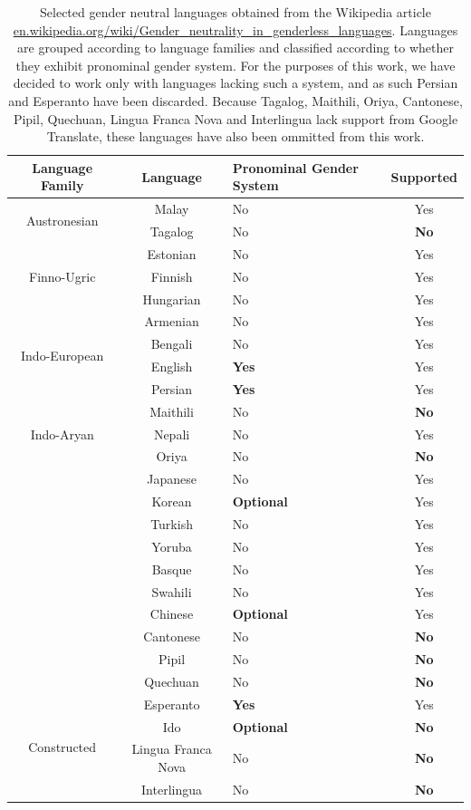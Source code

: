 \documentclass{article}
\begin{document}
\begin{table}[H]
	\centering
	\begin{tabular}{|c|c|m{3cm}|c|}
	\hline
	Language Family & Language & Pronominal Gender System & Supported \\ \hline
	\multirow{2}{*}{Austronesian} & Malay & No & Yes \\
	& Tagalog & No & \textbf{No} \\ \hline
	\multirow{3}{*}{Finno-Ugric} & Estonian & No & Yes \\
	& Finnish & No & Yes\\
	& Hungarian & No & Yes \\ \hline
	\multirow{4}{*}{Indo-European} & Armenian & No & Yes \\
	& Bengali & No & Yes \\
	& English & \textbf{Yes} & Yes \\
	& Persian & \textbf{Yes} & Yes \\ \hline
	\multirow{3}{*}{Indo-Aryan} & Maithili & No & \textbf{No} \\
	& Nepali & No & Yes \\
	& Oriya & No & \textbf{No} \\ \hline
	\multirow{10}{*}{} & Japanese & No & Yes \\
	& Korean & \textbf{Optional} & Yes \\
	& Turkish & No & Yes \\
	& Yoruba & No & Yes \\
	& Basque & No & Yes \\
	& Swahili & No & Yes \\
	& Chinese & \textbf{Optional} & Yes \\
	& Cantonese & No & \textbf{No} \\
	& Pipil & No & \textbf{No} \\
	& Quechuan & No & \textbf{No} \\ \hline
	\multirow{4}{*}{Constructed} & Esperanto & \textbf{Yes} & Yes \\
	& Ido & \textbf{Optional} & \textbf{No} \\
	& Lingua Franca Nova & No & \textbf{No} \\
	& Interlingua & No & \textbf{No} \\ \hline
	\end{tabular}
	\caption{Selected gender neutral languages obtained from the Wikipedia article \url{en.wikipedia.org/wiki/Gender_neutrality_in_genderless_languages}. Languages are grouped according to language families and classified according to whether they exhibit pronominal gender system. For the purposes of this work, we have decided to work only with languages lacking such a system, and as such Persian and Esperanto have been discarded. Because Tagalog, Maithili, Oriya, Cantonese, Pipil, Quechuan, Lingua Franca Nova and Interlingua lack support from Google Translate, these languages have also been ommitted from this work.}
\end{table}
\end{document}
